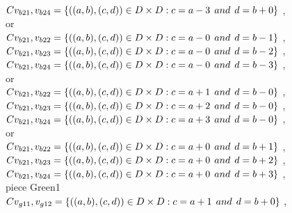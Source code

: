 \\$C{v_{b21},v_{b24}}=\{((a,b),(c,d))\in D\times D: c = a - 3\hspace{1ex} and \hspace{1ex}  d = b + 0 \}$ , 
\\or
\\$C{v_{b21},v_{b22}}=\{((a,b),(c,d))\in D\times D: c = a - 0\hspace{1ex} and \hspace{1ex}  d = b - 1 \}$ , 
\\$C{v_{b21},v_{b23}}=\{((a,b),(c,d))\in D\times D: c = a - 0\hspace{1ex} and \hspace{1ex}  d = b - 2 \}$ , 
\\$C{v_{b21},v_{b24}}=\{((a,b),(c,d))\in D\times D: c = a - 0\hspace{1ex} and \hspace{1ex}  d = b - 3 \}$ , 
\\or
\\$C{v_{b21},v_{b22}}=\{((a,b),(c,d))\in D\times D: c = a + 1\hspace{1ex} and \hspace{1ex}  d = b - 0 \}$ , 
\\$C{v_{b21},v_{b23}}=\{((a,b),(c,d))\in D\times D: c = a + 2\hspace{1ex} and \hspace{1ex}  d = b - 0 \}$ , 
\\$C{v_{b21},v_{b24}}=\{((a,b),(c,d))\in D\times D: c = a + 3\hspace{1ex} and \hspace{1ex}  d = b - 0 \}$ , 
\\or
\\$C{v_{b21},v_{b22}}=\{((a,b),(c,d))\in D\times D: c = a + 0\hspace{1ex} and \hspace{1ex}  d = b + 1 \}$ , 
\\$C{v_{b21},v_{b23}}=\{((a,b),(c,d))\in D\times D: c = a + 0\hspace{1ex} and \hspace{1ex}  d = b + 2 \}$ , 
\\$C{v_{b21},v_{b24}}=\{((a,b),(c,d))\in D\times D: c = a + 0\hspace{1ex} and \hspace{1ex}  d = b + 3 \}$ , 
\\ piece Green1 
\\$C{v_{g11},v_{g12}}=\{((a,b),(c,d))\in D\times D: c = a + 1\hspace{1ex} and \hspace{1ex}  d = b + 0 \}$ , 
